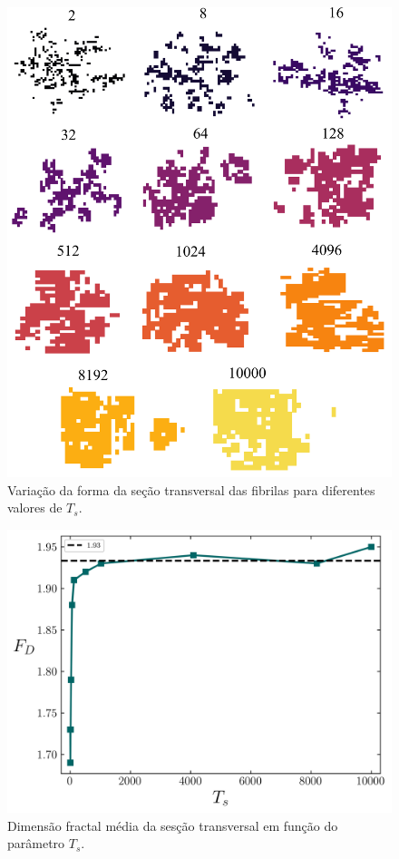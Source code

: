 \documentclass{article}
\begin{document}
    \begin{figure}[H]
        \centering
        \includegraphics[width=\textwidth]{figures/cs_all.png}
        \caption{Variação da forma da seção transversal das fibrilas para diferentes valores de \(T_{s}\).} 
        \label{R3}
    \end{figure}

    \begin{figure}[H]
        \centering
        \includegraphics[width=\textwidth]{figures/dim_frac.png}

        \caption{ Dimensão fractal média da sesção transversal em função do parâmetro \(T_{s}\).} 

        \label{R4}
    \end{figure}
\end{document}
